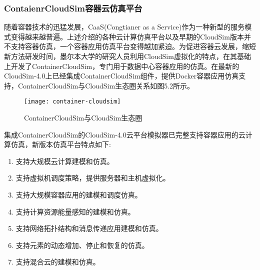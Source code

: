 \subsubsection{ContaienrCloudSim容器云仿真平台}
随着容器技术的迅猛发展，CaaS(Congtianer as a Service)作为一种新型的服务模式变得越来越普遍。上述介绍的各种云计算仿真平台以及早期的CloudSim版本并不支持容器仿真，一个容器应用仿真平台变得越加紧迫。为促进容器云发展，缩短新方法研发时间，墨尔本大学的研究人员利用CloudSim虚拟化的特点，在其基础上开发了ContainerCloudSim，专门用于数据中心容器应用的仿真。在最新的CloudSim-4.0上已经集成ContainerCloudSim组件，提供Docker容器应用仿真支持，ContainerCloudSim与CloudSim生态圈关系如图5.2所示。
\begin{figure}[H] %
	\centering
	\texttt{[image: container-cloudsim]}
	\caption{ContainerCloudSim与CloudSim生态圈}
\end{figure}
集成ContainerCloudSim的CloudSim-4.0云平台模拟器已完整支持容器应用的云计算仿真，新版本仿真平台特点如下:
\begin{enumerate}[(1)]
	\item 支持大规模云计算建模和仿真。
	\item 支持虚拟机调度策略，提供服务器和主机虚拟化。
	\item 支持大规模容器应用的建模和调度仿真。
	\item 支持计算资源能量感知的建模和仿真。
	\item 支持网络拓扑结构和消息传递应用建模和仿真。
	\item 支持元素的动态增加、停止和恢复的仿真。
	\item 支持混合云的建模和仿真。
\end{enumerate}

